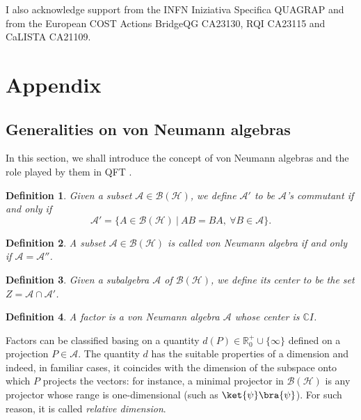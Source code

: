 \documentclass[a4paper,11pt]{article}
\newtheorem{Definition}{Definition}[subsection]
\begin{document}
I also acknowledge support from the INFN Iniziativa Specifica QUAGRAP and from the European COST Actions BridgeQG CA23130, RQI CA23115 and CaLISTA CA21109.

\newpage
\appendix
\section{Appendix}
\subsection{Generalities on von Neumann algebras}

In this section, we shall introduce the concept of von Neumann algebras and the role played by them in QFT \cite{Von Neumann} \cite{Naimark} \cite{Bratteli-Robinson} \cite{Sorce} \cite{Yvangson}.

\begin{Definition}
    Given a subset $\mathcal{A} \in \mathcal{B}(\mathcal{H})$, we define $\mathcal{A}'$ to be $\mathcal{A}$'s \textnormal{commutant} if and only if
    \begin{equation}
        \mathcal{A}' = \{ A \in \mathcal{B}(\mathcal{H}) \ | \ AB=BA, \ \forall B \in \mathcal{A} \} \text{.}
    \end{equation}
\end{Definition}

\begin{Definition}
    A subset $\mathcal{A} \in \mathcal{B}(\mathcal{H})$ is called \textnormal{von Neumann algebra} if and only if $\mathcal{A} = \mathcal{A}''$.
\end{Definition}

\begin{Definition}
   Given a subalgebra $\mathcal{A}$ of $\mathcal{B}(\mathcal{H})$, we define its \textnormal{center} to be the set $Z = \mathcal{A} \cap \mathcal{A}'$.
\end{Definition}

\begin{Definition}
    A \textnormal{factor} is a von Neumann algebra $\mathcal{A}$ whose center is $\mathbb{C}I$.
\end{Definition}

Factors can be classified basing on a quantity $d(P) \in \mathbb{R}_0^+ \cup \{ \infty \}$ defined on a projection $P \in \mathcal{A}$. The quantity $d$ has the suitable properties of a dimension and indeed, in familiar cases, it coincides with the dimension of the subspace onto which $P$ projects the vectors: for instance, a minimal projector in $\mathcal{B}(\mathcal{H})$ is any projector whose range is one-dimensional (such as $\ket{\psi}\bra{\psi}$). For such reason, it is called \textit{relative dimension}.
\end{document}
